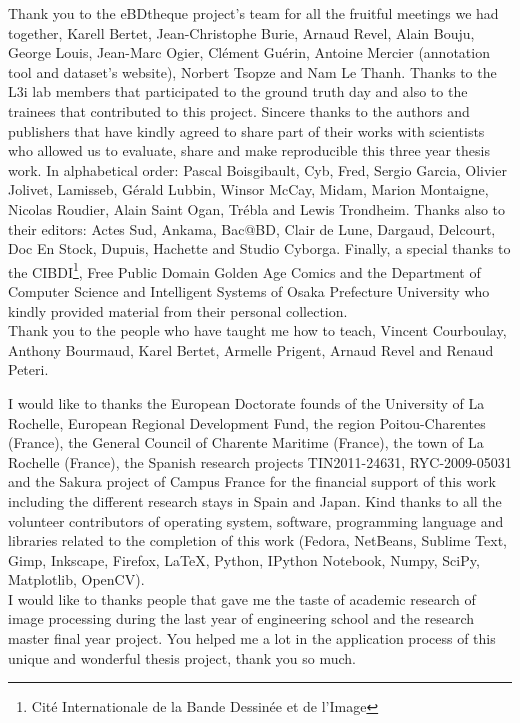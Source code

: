 Thank you to the eBDtheque project's team for all the fruitful meetings we had together, Karell Bertet, Jean-Christophe Burie, Arnaud Revel, Alain Bouju, George Louis, Jean-Marc Ogier, Cl\'{e}ment Gu\'{e}rin, Antoine Mercier (annotation tool and dataset's website), Norbert Tsopze and Nam Le Thanh.
Thanks to the L3i lab members that participated to the ground truth day and also to the trainees that contributed to this project.
Sincere thanks to the authors and publishers that have kindly agreed to share part of their works with scientists who allowed us to evaluate, share and make reproducible this three year thesis work.
In alphabetical order: Pascal Boisgibault, Cyb, Fred, Sergio Garcia, Olivier Jolivet, Lamisseb, G\'{e}rald Lubbin, Winsor McCay, Midam, Marion Montaigne, Nicolas Roudier, Alain Saint Ogan, Tr\'ebla and Lewis Trondheim.
Thanks also to their editors: Actes Sud, Ankama, Bac@BD, Clair de Lune, Dargaud, Delcourt, Doc En Stock, Dupuis, Hachette and Studio Cyborga.
Finally, a special thanks to the CIBDI\footnote{Cit\'e Internationale de la Bande Dessin\'ee et de l'Image}, Free Public Domain Golden Age Comics and the Department of Computer Science and Intelligent Systems of Osaka Prefecture University who kindly provided material from their personal collection.
\\


Thank you to the people who have taught me how to teach, Vincent Courboulay, Anthony Bourmaud, Karel Bertet, Armelle Prigent, Arnaud Revel and Renaud Peteri.

I would like to thanks the European Doctorate founds of the University of La Rochelle, European Regional Development Fund, the region Poitou-Charentes (France), the General Council of Charente Maritime (France), the town of La Rochelle (France), the Spanish research projects TIN2011-24631, RYC-2009-05031 and the Sakura project of Campus France for the financial support of this work including the different research stays in Spain and Japan.
Kind thanks to all the volunteer contributors of operating system, software, programming language and libraries related to the completion of this work (Fedora, NetBeans, Sublime Text, Gimp, Inkscape, Firefox, \LaTeX, Python, IPython Notebook, Numpy, SciPy, Matplotlib, OpenCV).
\\

I would like to thanks people that gave me the taste of academic research of image processing during the last year of engineering school and the research master final year project.
You helped me a lot in the application process of this unique and wonderful thesis project, thank you so much.
\\

